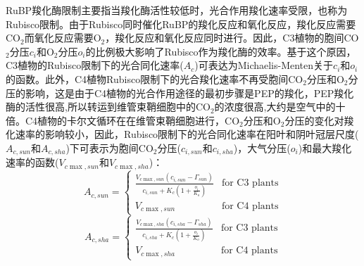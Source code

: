 RuBP羧化酶限制主要指当羧化酶活性较低时，光合作用羧化速率受限，也称为Rubisco限制。由于Rubisco同时催化RuBP的羧化反应和氧化反应，羧化反应需要CO$_2$而氧化反应需要O$_2$，羧化反应和氧化反应同时进行。因此，C3植物的胞间CO$_2$分压$c_i$和O$_2$分压$o_i$的比例极大影响了Rubisco作为羧化酶的效率。基于这个原因，C3植物的Rubisco限制下的光合同化速率($A_c$)可表达为Michaelis-Menten关于$c_i$和$o_i$的函数。此外，C4植物Rubisco限制下的光合羧化速率不再受胞间CO$_2$分压和O$_2$分压的影响，这是由于C4植物的光合作用途径的最初步骤是PEP的羧化，PEP羧化酶的活性很高,所以转运到维管束鞘细胞中的CO$_2$的浓度很高,大约是空气中的十倍。C4植物的卡尔文循环在在维管束鞘细胞进行，CO$_2$分压和O$_2$分压的变化对羧化速率的影响较小，因此，Rubisco限制下的光合同化速率在阳叶和阴叶冠层尺度($A_{c,sun}$和$A_{c,sha}$)下可表示为胞间CO$_2$分压($c_{i,sun}$和$c_{i,sha}$)，大气分压($o_{i}$)和最大羧化速率的函数($V_{c \max,sun}$和$V_{c \max,sha}$)：
\begin{equation}\label{A_C1sun}
A_{c,sun}=\begin{cases}
\frac{V_{c \max,sun}\left(c_{i,sun}-\Gamma_{sun}\right)}{c_{i,sun}+K_{c}\left(1+\frac{o_{i}}{K_{o}}\right)}
     & \text{for C3 plants} \\ 
V_{c \max,sun } & \text{for C4 plants}
\end{cases}
\end{equation}
\begin{equation}\label{A_C1sha}
A_{c,sha}=\begin{cases}
\frac{V_{c \max,sha}\left(c_{i,sha}-\Gamma_{sha}\right)}{c_{i,sha}+K_{c}\left(1+\frac{o_{i}}{K_{o}}\right)}
     & \text{for C3 plants} \\ 
V_{c \max,sha } & \text{for C4 plants}
\end{cases}
\end{equation}

